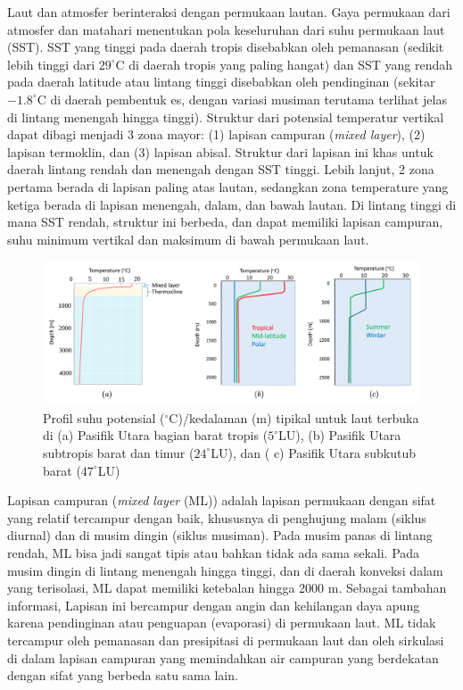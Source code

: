 \begin{spacing}{1.5}
	Laut dan atmosfer berinteraksi dengan permukaan lautan. Gaya permukaan dari atmosfer dan matahari menentukan pola keseluruhan dari suhu permukaan laut (SST). SST yang tinggi pada daerah tropis disebabkan oleh pemanasan (sedikit lebih tinggi dari $29^\circ$C di daerah tropis yang paling hangat) dan SST yang rendah pada daerah latitude atau lintang tinggi disebabkan oleh pendinginan (sekitar $-1.8^\circ$C di daerah pembentuk es, dengan variasi musiman terutama
	terlihat jelas di lintang menengah hingga tinggi). Struktur dari potensial temperatur vertikal dapat dibagi menjadi 3 zona mayor: (1) lapisan campuran (\textit{mixed layer}), (2) lapisan termoklin, dan (3) lapisan abisal. Struktur dari lapisan ini khas untuk daerah lintang rendah dan menengah dengan SST tinggi. Lebih lanjut, 2 zona pertama berada di lapisan paling atas lautan, sedangkan zona temperature yang ketiga berada di lapisan menengah, dalam, dan bawah lautan. Di lintang tinggi di mana SST rendah, struktur ini berbeda, dan dapat memiliki lapisan campuran, suhu minimum vertikal dan maksimum di bawah permukaan laut.
	
	\begin{figure}[H]
		\centering
		\includegraphics[width=13cm]{contents/mld_theory}
		\caption{Profil suhu potensial ($^\circ$C)/kedalaman (m) tipikal untuk laut terbuka di (a) Pasifik Utara bagian barat tropis ($5^\circ$LU), (b) Pasifik Utara subtropis barat dan timur ($24^\circ$LU), dan ( c) Pasifik Utara subkutub barat ($47^\circ$LU) \protect{}}
		\label{fig:mld_theory}
	\end{figure}
	Lapisan campuran (\textit{mixed layer} (ML)) adalah lapisan permukaan dengan sifat yang relatif tercampur dengan baik, khususnya di penghujung malam (siklus diurnal) dan di musim dingin (siklus musiman). Pada musim panas di lintang rendah, ML bisa jadi sangat tipis atau bahkan tidak ada sama sekali. Pada musim dingin di lintang menengah hingga tinggi, dan di daerah konveksi dalam yang terisolasi, ML dapat memiliki ketebalan hingga 2000 m. Sebagai tambahan informasi, Lapisan ini bercampur dengan angin dan kehilangan daya apung karena pendinginan atau penguapan (evaporasi) di permukaan laut. ML tidak tercampur oleh pemanasan dan presipitasi di permukaan laut dan oleh sirkulasi di dalam lapisan campuran yang memindahkan air campuran yang berdekatan dengan sifat yang berbeda satu sama lain.
	

\end{spacing}
